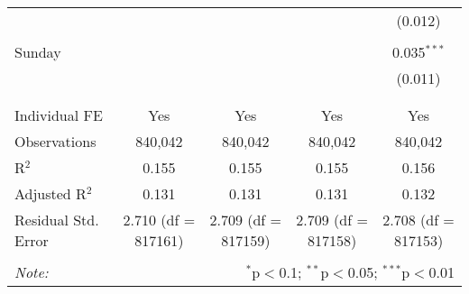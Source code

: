 \documentclass[
]{article}
\begin{document}
\begin{table}[!htbp]
{\begin{tabular}{@{\extracolsep{5pt}}lcccc}
  &  &  &  & (0.012) \\ 
  & & & & \\ 
 Sunday &  &  &  & 0.035$^{***}$ \\ 
  &  &  &  & (0.011) \\ 
  & & & & \\ 
\hline \\[-1.8ex] 
Individual FE & Yes & Yes & Yes & Yes \\ 
Observations & 840,042 & 840,042 & 840,042 & 840,042 \\ 
R$^{2}$ & 0.155 & 0.155 & 0.155 & 0.156 \\ 
Adjusted R$^{2}$ & 0.131 & 0.131 & 0.131 & 0.132 \\ 
Residual Std. Error & 2.710 (df = 817161) & 2.709 (df = 817159) & 2.709 (df = 817158) & 2.708 (df = 817153) \\ 
\hline 
\hline \\[-1.8ex] 
\textit{Note:}  & \multicolumn{4}{r}{$^{*}$p$<$0.1; $^{**}$p$<$0.05; $^{***}$p$<$0.01} \\ 
\end{tabular}
} 
\end{table} 
\newpage
\end{document}
